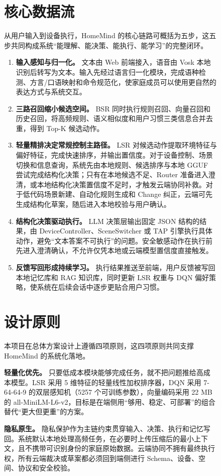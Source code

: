 \documentclass[12pt,a4paper,oneside]{ctexrep}
\begin{document}
\begin{figure}[H]
\section{核心数据流}

从用户输入到设备执行，HomeMind 的核心链路可概括为五步，这五步共同构成系统“能理解、能决策、能执行、能学习”的完整闭环。

\begin{enumerate}
    \item \textbf{输入感知与归一化。} 文本由 Web 前端接入，语音由 Vosk 本地识别后转写为文本。输入先经过语言归一化模块，完成语种检测、方言/口语映射和命令规范化，使家庭成员可以使用更自然的表达方式与系统交互。
    \item \textbf{三路召回缩小候选空间。} BSR 同时执行规则召回、向量召回和历史召回，将高频规则、语义相似度和用户习惯三类信息合并去重，得到 Top-K 候选动作。
    \item \textbf{轻量精排决定常规控制主路径。} LSR 对候选动作提取环境特征与偏好特征，完成快速排序，并输出置信度。对于设备控制、场景切换和信息查询，系统先由本地规则、候选排序与本地 GGUF 尝试完成结构化决策；只有在本地候选不足、Router 准备进入澄清，或本地结构化决策置信度不足时，才触发云端协同补救。对于低代码场景新建、自动化规则生成和 Change 纠正，云端可先生成结构化草案，随后进入本地校验与用户确认。
    \item \textbf{结构化决策驱动执行。} LLM 决策层输出固定 JSON 结构的结果，由 DeviceController、SceneSwitcher 或 TAP 引擎执行具体动作，避免“文本答案不可执行”的问题。安全敏感动作在执行前先进入澄清确认，不允许仅凭本地或云端模型置信度直接触发。
    \item \textbf{反馈写回形成持续学习。} 执行结果推送至前端，用户反馈被写回本地记忆库和 RAG 知识库，同时更新 LSR 权重与 DQN 偏好策略，使系统在后续会话中逐步更贴合用户习惯。
\end{enumerate}

\section{设计原则}

本项目在总体方案设计上遵循四项原则，这四项原则共同支撑 HomeMind 的系统化落地。

\textbf{轻量化优先。} 只要低成本模块能够完成任务，就不把问题推给高成本模型。LSR 采用 5 维特征的轻量线性加权排序器，DQN 采用 7-64-64-9 的双层感知机（5257 个可训练参数），向量编码采用 22 MB 的 all-MiniLM-L6-v2，目标是在端侧用“够用、稳定、可部署”的组合替代“更大但更重”的方案。

\textbf{隐私原生。} 隐私保护作为主链约束贯穿输入、决策、执行和记忆写回。系统默认本地处理高频任务，在必要时上传压缩后的最小上下文，且不携带可识别身份的家庭原始数据。云端协同不拥有最终执行权，所有云端裁决或草案都必须回到端侧进行 Schema、设备、空间、协议和安全校验。


\end{figure}
\end{document}
